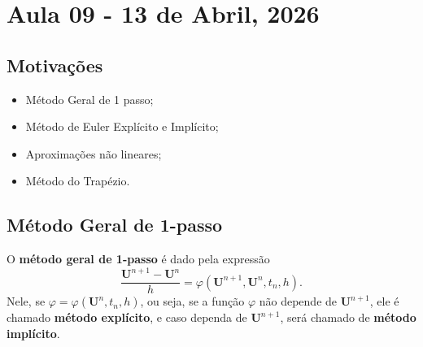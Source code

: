\documentclass[../differential_methods.tex]{subfiles}
\begin{document}
\section{Aula 09 - 13 de Abril, 2026}
\subsection{Motivações}
\begin{itemize}
	\item Método Geral de 1 passo;
	\item Método de Euler Explícito e Implícito;
	\item Aproximações não lineares;
	\item Método do Trapézio.
\end{itemize}
\subsection{Método Geral de 1-passo}
O \textbf{método geral de 1-passo} é dado pela expressão
\[
	\frac{\mathbf{U}^{n+1}-\mathbf{U}^{n}}{h} = \varphi (\mathbf{U}^{n+1}, \mathbf{U}^{n}, t_{n}, h).
\]
Nele, se \(\varphi  = \varphi (\mathbf{U}^{n}, t_{n}, h)\), ou seja, se a função \(\varphi \) não depende de \(\mathbf{U}^{n+1}\), ele é chamado \textbf{método explícito}, e caso dependa de \(\mathbf{U}^{n+1}\), será chamado de \textbf{método implícito}.
\end{document}
